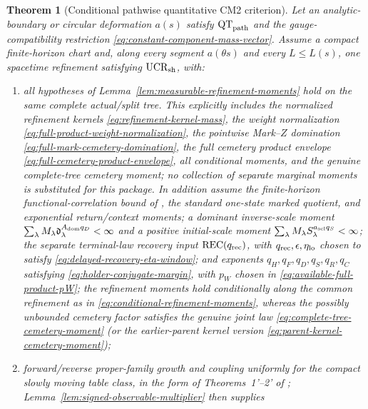 \documentclass[11pt]{article}
\newtheorem{theorem}{Theorem}[section]
\begin{document}
\begin{theorem}[Conditional pathwise quantitative CM2 criterion]
\label{thm:global-cm2-assembly}
Let an analytic-boundary or circular deformation $a(s)$ satisfy
$\mathrm{QT}_{\rm path}$ and the gauge-compatibility restriction
\eqref{eq:constant-component-mass-vector}.
Assume a compact finite-horizon chart and, along every segment
$a(\theta s)$ and every $L\le L(s)$, one spacetime refinement satisfying
$\mathrm{UCR}_{\rm sh}$, with:
\begin{enumerate}[label=\textup{(H\arabic*)}]
\item all hypotheses of
      Lemma~\ref{lem:measurable-refinement-moments} hold on the same complete
      actual/split tree.  This explicitly includes the normalized refinement
      kernels \eqref{eq:refinement-kernel-mass}, the weight normalization
      \eqref{eq:full-product-weight-normalization}, the pointwise Mark--$Z$
      domination \eqref{eq:full-mark-cemetery-domination}, the full cemetery
      product envelope \eqref{eq:full-cemetery-product-envelope}, all
      conditional moments, and the genuine complete-tree cemetery moment;
      no collection of separate marginal moments is substituted for this
      package.  In addition assume the finite-horizon functional-correlation bound of \cite{LS}, the
      standard one-state marked quotient, and exponential return/context
      moments; a dominant inverse-scale moment
      $\sum_\lambda M_\lambda
      \mathfrak d_\lambda^{A_{\rm dom}q_D}<\infty$ and a positive initial-scale
      moment $\sum_\lambda M_\lambda
      S_\lambda^{a_{\rm scl}q_S}<\infty$; the separate terminal-law
      recovery input $\mathrm{REC}(q_{\rm rec})$, with
      $q_{\rm rec},\epsilon,\eta_{\rm lo}$ chosen to satisfy
      \eqref{eq:delayed-recovery-eta-window}; and
      exponents $q_H,q_F,q_D,q_S,q_R,q_C$ satisfying
      \eqref{eq:holder-conjugate-margin}, with $p_W$ chosen in
      \eqref{eq:available-full-product-pW}; the refinement moments hold
      conditionally along the common refinement as in
      \eqref{eq:conditional-refinement-moments}, whereas the possibly
      unbounded cemetery factor satisfies the genuine joint law
      \eqref{eq:complete-tree-cemetery-moment} (or the earlier-parent kernel
      version \eqref{eq:parent-kernel-cemetery-moment});
\item forward/reverse proper-family growth and coupling uniformly for the
      compact slowly moving table class, in the form of Theorems~1'--2' of
      \cite{SYZ}; Lemma~\ref{lem:signed-observable-multiplier} then supplies

\end{enumerate}
\end{theorem}
\end{document}
